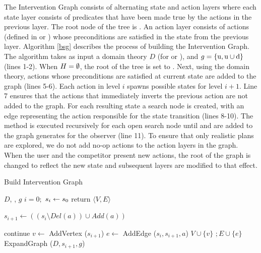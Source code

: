 The Intervention Graph consists of alternating state and action layers where each state layer consists of predicates that have been made true by the actions in the previous layer. 
The root node of the tree is \historyEndState.
An action layer consists of actions (defined in \domainUser or \domainOther) whose preconditions are satisfied in the state from the previous layer. 
Algorithm \ref{bsg} describes the process of building the Intervention Graph. 
The algorithm takes as input a domain theory $D$ (for \domainUser or \domainOther), \historyEndState and $g=\lbrace\mathrm{u}, \mathrm{u}\cup\mathrm{d} \rbrace$ (lines 1-2). 
When $H=\emptyset$, the root of the tree is set to \initialState. 
Next, using the domain theory, actions whose preconditions are satisfied at current state are added to the graph (lines 5-6).
Each action in level $i$ spawns possible states for level $i+1$. Line 7 ensures that the actions that immediately inverts the previous action are not added to the graph. 
For each resulting state a search node is created, with an edge representing the action responsible for the state transition (lines 8-10). 
The method is executed recursively for each open search node until \desired and \undesired are added to the graph generates \Suffixes for the observer (line 11). 
To ensure that only realistic plans are explored, we do not add no-op actions to the action layers in the graph. 
When the user and the competitor present new actions, the root of the graph is changed to reflect the new state \historyEndState and subsequent layers are  modified to that effect.  


\begin{algorithm}[ptb]
        \caption{Build Intervention Graph}
        \label{bsg}
        \begin{algorithmic}[1]
                \Require $D$, \historyEndState, $g$
                \State $i=0;$ $ s_{i} \gets s_0$
                 return $\langle V,E\rangle$
                \Else
                                \State \parbox[t]{0.95\linewidth} 
                                {$s_{i+1} \gets ((s_{i} \setminus Del(a))\cup Add(a))$}
                                 continue \EndIf
                                \State $v \gets$ AddVertex ($s_{i+1}$)
                                \State $e \gets$ AddEdge ($s_i, s_{i+1}, a$)
                                \State $V \cup \{v\}$ $; E \cup \{e\}$
                                \State ExpandGraph ($D, s_{i+1}, g$)
                        \EndFor
                \EndIf  
                \EndProcedure
        \end{algorithmic}
\end{algorithm}

